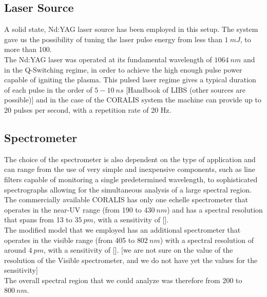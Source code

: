 \subsection{Laser Source}
\label{subsec:laster_source}
A solid state, Nd:YAG laser source has been employed in this setup. The system gave us the possibility of tuning the laser pulse energy from less than $1 \: mJ$,  to more than 100.
\\
The Nd:YAG laser was operated at its fundamental wavelength of $1064 \: nm$ and in the Q-Switching regime, in order to achieve the high enough pulse power capable of igniting the plasma. This pulsed laser regime gives a typical duration of each pulse in the order of $5-10\: ns$ [Handbook of LIBS (other sources are possible)] and in the case of the CORALIS system the machine can provide up to 20 pulses per second, with a repetition rate of 20 Hz.

\subsection{Spectrometer}
\label{subsec:spectrometer}
The choice of the spectrometer is also dependent on the type of application and can range from the use of very simple and inexpensive components, such as line filters capable of monitoring a single predetermined wavelength, to sophisticated spectrographs allowing for the simultaneous analysis of a large spectral region.
\\
The commercially available CORALIS has only one echelle spectrometer that operates in the near-UV range (from 190 to $430 \: nm$) and has a spectral resolution that spans from 13 to $35 \: pm$, with a sensitivity of [].
\\
The modified model that we employed has an additional spectrometer that operates in the visible range (from 405 to $802\: nm$) with a spectral resolution of around $4 \: pm$, with a sensitivity of [].
[we are not sure on the value of the resolution of the Visible spectrometer, and we do not have yet the values for the sensitivity]
\\
The overall spectral region that we could analyze was therefore from 200 to $800 \: nm$.

